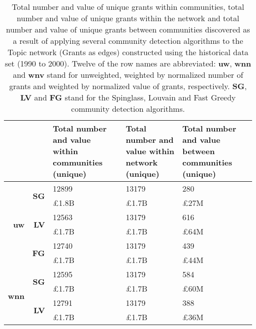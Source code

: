 \begin{table}[!htbp]
\centering
\caption[Total number and value of unique grants within communities, total number and value of unique grants within the network and total number and value of unique grants between communities discovered in the Topic network (Grants as edges) constructed using the historical data set (1990 to 2000)]{Total number and value of unique grants within communities, total number and value of unique grants within the network and total number and value of unique grants between communities discovered as a result of applying several community detection algorithms to the Topic network (Grants as edges) constructed using the historical data set (1990 to 2000). Twelve of the row names are abbreviated: \textbf{uw}, \textbf{wnn} and \textbf{wnv} stand for unweighted, weighted by normalized number of grants and weighted by normalized value of grants, respectively. \textbf{SG}, \textbf{LV} and \textbf{FG} stand for the Spinglass, Louvain and Fast Greedy community detection algorithms.}
\label{table:topic_a_historical2_grants2_appendix}
\begin{tabular}{r|r|>{\raggedleft\arraybackslash}p{3.5cm}|>{\raggedleft\arraybackslash}p{3.2cm}|>{\raggedleft\arraybackslash}p{3.5cm}}
\multicolumn{2}{c|}{} & \textbf{Total number and value within communities (unique)} & \textbf{Total number and value within network (unique)} & \textbf{Total number and value between communities (unique)}\\
\hline
\multirow{6}{*}{\textbf{uw}}
& \multirow{2}{*}{\textbf{SG}}
& {12899} & {13179} & {280}\\
& {} & {\pounds1.8B} & {\pounds1.7B} & {\pounds27M}\\
\cline{2-5}
& \multirow{2}{*}{\textbf{LV}}
& {12563} & {13179} & {616}\\
& {} & {\pounds1.7B} & {\pounds1.7B} & {\pounds64M}\\
\cline{2-5}
& \multirow{2}{*}{\textbf{FG}}
& {12740} & {13179} & {439}\\
& {} & {\pounds1.7B} & {\pounds1.7B} & {\pounds44M}\\
\hline
\multirow{6}{*}{\textbf{wnn}}
& \multirow{2}{*}{\textbf{SG}}
& {12595} & {13179} & {584}\\
& {} & {\pounds1.7B} & {\pounds1.7B} & {\pounds60M}\\
\cline{2-5}
& \multirow{2}{*}{\textbf{LV}}
& {12791} & {13179} & {388}\\
& {} & {\pounds1.7B} & {\pounds1.7B} & {\pounds36M}\\

\end{tabular}
\end{table}
